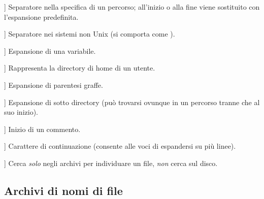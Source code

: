 \documentclass{article}
\begin{document}
\newcommand{\CODE}[1]{\makebox[3em][l]{\code{#1}}}
\begin{ttdescription}
\item[\CODE{:}] Separatore nella specifica di un percorso; all'inizio o
    alla fine viene sostituito con l'espansione predefinita.\par
\item[\CODE{;}] Separatore nei sistemi non Unix (si comporta come
    \code{:}).
\item[\CODE{\$}] Espansione di una variabile.
\item[\CODE{\string~}] Rappresenta la directory di home di un utente.
\item[\CODE{\char`\{...\char`\}}] Espansione di parentesi graffe.
\item[\CODE{//}] Espansione di sotto directory (può trovarsi ovunque in un
    percorso tranne che al suo inizio).
\item[\CODE{\%}] Inizio di un commento.
\item[\CODE{\bs}] Carattere di continuazione (consente alle voci di
    espandersi su più linee).
\item[\CODE{!!}] Cerca \emph{solo} negli archivi per individuare un file,
    \emph{non} cerca sul disco.
\end{ttdescription}


\subsection{Archivi di nomi di file}
\label{sec:filename-database}
\end{document}
